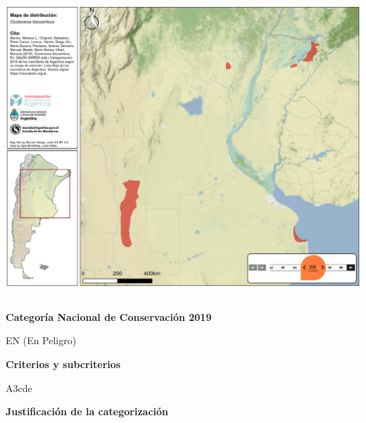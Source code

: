 \documentclass[
  x11names]{article}
\begin{document}
\includegraphics[width=1\linewidth]{maps/Cetartiodactyla/Ozotoceros_bezoarticus}

%
\begin{table}[H]
\centering
\begin{tabular}[t]{>{\raggedright\arraybackslash}m{16cm}>{}m{16cm}}
\toprule
\cellcolor{ceil}{\textcolor{white}{\textbf{\rule{0pt}{14pt}CATEGORÍAS DE CONSERVACIÓN}}}\\
\bottomrule
\end{tabular}
\end{table}

\vspace{-0.4cm}

\textbf{Categoría Nacional de Conservación 2019}

EN (En Peligro)

\textbf{Criterios y subcriterios}

A3cde

\textbf{Justificación de la categorización}
\end{document}
